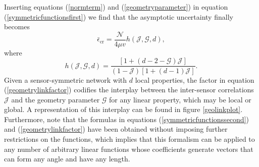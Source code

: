 Inserting equations (\ref{normterm}) and (\ref{geometryparameter}) in equation (\ref{symmetricfunctionsfirst}) we find that the asymptotic uncertainty finally becomes
\begin{equation}
\bar{\epsilon}_{\mathrm{cr}} = \frac{\mathcal{N}}{4\mu v}h\left(\mathcal{J}, \mathcal{G}, d\right),
\label{symmetricfunctionssecond}
\end{equation}
where
\begin{equation}
h\left(\mathcal{J}, \mathcal{G}, d\right) = \frac{\left[1 + (d-2 - \mathcal{G})\mathcal{J}\right]}{(1 -\mathcal{J})[1+(d-1)\mathcal{J}]}.
\label{geometrylinkfactor}
\end{equation}
Given a sensor-symmetric network with $d$ local properties, the factor in equation (\ref{geometrylinkfactor}) codifies the interplay between the inter-sensor correlations $\mathcal{J}$ and the geometry parameter $\mathcal{G}$ for any linear property, which may be local or global. A representation of this interplay can be found in figure \ref{geolinkplot}. Furthermore, note that the formulas in equations (\ref{symmetricfunctionssecond}) and (\ref{geometrylinkfactor}) have been obtained without imposing further restrictions on the functions, which implies that this formalism can be applied to any number of arbitrary linear functions whose coefficients generate vectors that can form any angle and have any length. 

